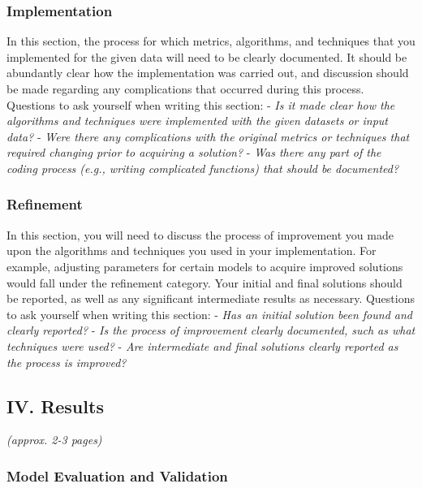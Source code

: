 \documentclass[]{report}
\begin{document}
\subsubsection{Implementation}\label{implementation}

In this section, the process for which metrics, algorithms, and
techniques that you implemented for the given data will need to be
clearly documented. It should be abundantly clear how the implementation
was carried out, and discussion should be made regarding any
complications that occurred during this process. Questions to ask
yourself when writing this section: - \emph{Is it made clear how the
algorithms and techniques were implemented with the given datasets or
input data?} - \emph{Were there any complications with the original
metrics or techniques that required changing prior to acquiring a
solution?} - \emph{Was there any part of the coding process (e.g.,
writing complicated functions) that should be documented?}

\subsubsection{Refinement}\label{refinement}

In this section, you will need to discuss the process of improvement you
made upon the algorithms and techniques you used in your implementation.
For example, adjusting parameters for certain models to acquire improved
solutions would fall under the refinement category. Your initial and
final solutions should be reported, as well as any significant
intermediate results as necessary. Questions to ask yourself when
writing this section: - \emph{Has an initial solution been found and
clearly reported?} - \emph{Is the process of improvement clearly
documented, such as what techniques were used?} - \emph{Are intermediate
and final solutions clearly reported as the process is improved?}

\subsection{IV. Results}\label{iv.-results}

\emph{(approx. 2-3 pages)}

\subsubsection{Model Evaluation and
Validation}\label{model-evaluation-and-validation}
\end{document}
